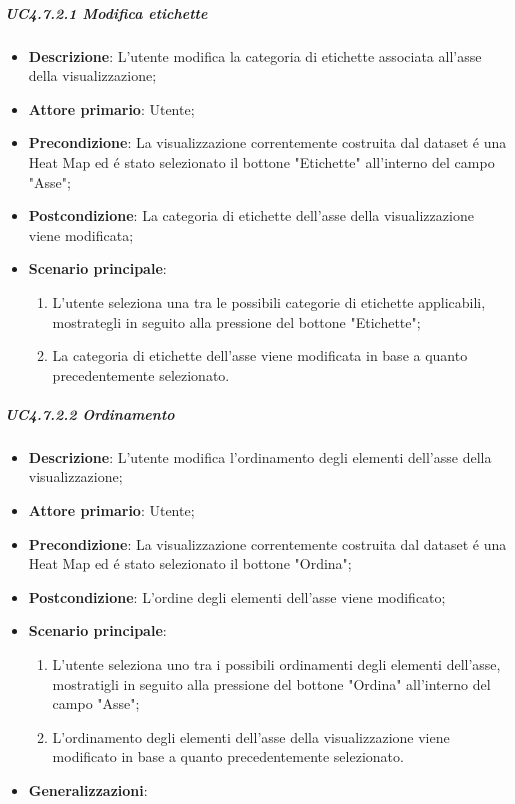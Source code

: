 \subparagraph{UC4.7.2.1 Modifica etichette}
\label{spar:uc4.7.2.1}
\begin{itemize}
    \item \textbf{Descrizione}:     L'utente modifica la categoria di etichette associata all'asse della visualizzazione;
    \item \textbf{Attore primario}: Utente;
    \item \textbf{Precondizione}:   La visualizzazione correntemente costruita dal dataset é una Heat Map ed é stato selezionato il bottone "Etichette" all'interno del campo "Asse";
    \item \textbf{Postcondizione}:  La categoria di etichette dell'asse della visualizzazione viene modificata;
    \item \textbf{Scenario principale}:
    \begin{enumerate}
        \item L'utente seleziona una tra le possibili categorie di etichette applicabili, mostrategli in seguito alla pressione del bottone "Etichette";
        \item La categoria di etichette dell'asse viene modificata in base a quanto precedentemente selezionato.
    \end{enumerate}
\end{itemize}

\subparagraph{UC4.7.2.2 Ordinamento}
\label{spar:uc4.7.2.2}
\begin{itemize}
    \item \textbf{Descrizione}:     L'utente modifica l'ordinamento degli elementi dell'asse della visualizzazione;
    \item \textbf{Attore primario}: Utente;
    \item \textbf{Precondizione}:   La visualizzazione correntemente costruita dal dataset é una Heat Map ed é stato selezionato il bottone "Ordina";
    \item \textbf{Postcondizione}:  L'ordine degli elementi dell'asse viene modificato;
    \item \textbf{Scenario principale}:
    \begin{enumerate}
        \item L'utente seleziona uno tra i possibili ordinamenti degli elementi dell'asse, mostratigli in seguito alla pressione del bottone "Ordina" all'interno del campo "Asse";
        \item L'ordinamento degli elementi dell'asse della visualizzazione viene modificato in base a quanto precedentemente selezionato.
    \end{enumerate}
    \item \textbf{Generalizzazioni}:
\end{itemize}

